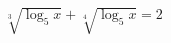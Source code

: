 \begin{ex}[type=equation]
	\begin{condition}
		$\sqrt[3]{\log_5 x} + \sqrt[4]{\log_5 x} = 2$
	\end{condition}
\end{ex}